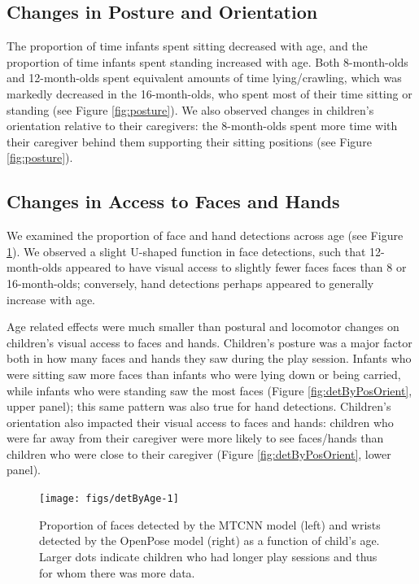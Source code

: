 \documentclass[10pt, letterpaper]{article}
\newenvironment{CodeChunk}{}{}
\begin{document}
\subsection{Changes in Posture and
Orientation}\label{changes-in-posture-and-orientation}

The proportion of time infants spent sitting decreased with age, and the
proportion of time infants spent standing increased with age. Both
8-month-olds and 12-month-olds spent equivalent amounts of time
lying/crawling, which was markedly decreased in the 16-month-olds, who
spent most of their time sitting or standing (see Figure
\ref{fig:posture}). We also observed changes in children's orientation
relative to their caregivers: the 8-month-olds spent more time with
their caregiver behind them supporting their sitting positions (see
Figure \ref{fig:posture}).

\subsection{Changes in Access to Faces and
Hands}\label{changes-in-access-to-faces-and-hands}

We examined the proportion of face and hand detections across age (see
Figure \ref{fig:detByAge}). We observed a slight U-shaped function in
face detections, such that 12-month-olds appeared to have visual access
to slightly fewer faces faces than 8 or 16-month-olds; conversely, hand
detections perhaps appeared to generally increase with age.

Age related effects were much smaller than postural and locomotor
changes on children's visual access to faces and hands. Children's
posture was a major factor both in how many faces and hands they saw
during the play session. Infants who were sitting saw more faces than
infants who were lying down or being carried, while infants who were
standing saw the most faces (Figure \ref{fig:detByPosOrient}, upper
panel); this same pattern was also true for hand detections. Children's
orientation also impacted their visual access to faces and hands:
children who were far away from their caregiver were more likely to see
faces/hands than children who were close to their caregiver (Figure
\ref{fig:detByPosOrient}, lower panel).

\begin{CodeChunk}
\begin{figure}[h]

{\centering \texttt{[image: figs/detByAge-1]} 

}

\caption[Proportion of faces detected by the MTCNN model (left) and wrists detected by the OpenPose model (right) as a function of child's age]{Proportion of faces detected by the MTCNN model (left) and wrists detected by the OpenPose model (right) as a function of child's age. Larger dots indicate children who had longer play sessions and thus for whom there was more data.}\label{fig:detByAge}
\end{figure}
\end{CodeChunk}
\end{document}
